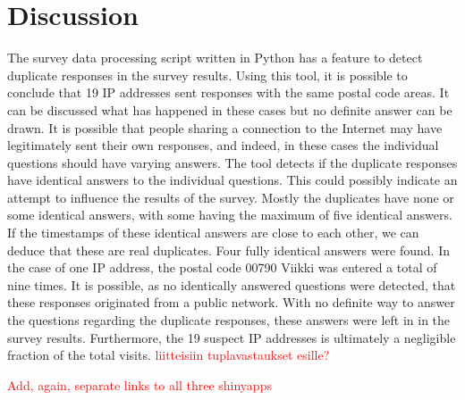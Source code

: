 \section{Discussion}
\justify



The survey data processing script written in Python has a feature to detect duplicate responses in the survey results. Using this tool, it is possible to conclude that 19 IP addresses sent responses with the same postal code areas. It can be discussed what has happened in these cases but no definite answer can be drawn. It is possible that people sharing a connection to the Internet may have legitimately sent their own responses, and indeed, in these cases the individual questions should have varying answers. The tool detects if the duplicate responses have identical answers to the individual questions. This could possibly indicate an attempt to influence the results of the survey. Mostly the duplicates have none or some identical answers, with some having the maximum of five identical answers. If the timestamps of these identical answers are close to each other, we can deduce that these are real duplicates. Four fully identical answers were found. In the case of one IP address, the postal code 00790 Viikki was entered a total of nine times. It is possible, as no identically answered questions were detected, that these responses originated from a public network. With no definite way to answer the questions regarding the duplicate responses, these answers were left in in the survey results. Furthermore, the 19 suspect IP addresses is ultimately a negligible fraction of the total visits. \textcolor{red}{liitteisiin tuplavastaukset esille?}

\textcolor{red}{Add, again, separate links to all three shinyapps}
